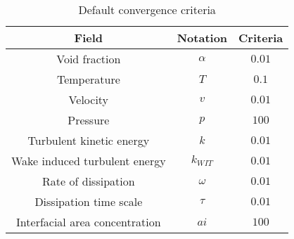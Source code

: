 \begin{table}[!h]
    \centering
       \begin{tabular}{c c c}
        \toprule
        Field & Notation & Criteria   \\
        \midrule
        \rowcolor[gray]{0.9} Void fraction & $\alpha$  & $0.01$  \\
        Temperature & $T$  & $0.1$ \\
        \rowcolor[gray]{0.9} Velocity & $v$ &  $0.01$ \\
        Pressure & $p$  &  $100$\\
        \rowcolor[gray]{0.9} Turbulent kinetic energy & $k$   &  $0.01$\\
        Wake induced turbulent energy & $k_{WIT}$ &   $0.01$\\
        \rowcolor[gray]{0.9} Rate of dissipation & $\omega$  &  $0.01$\\
        Dissipation time scale & $\tau$  &  $0.01$ \\
        \rowcolor[gray]{0.9} Interfacial area concentration & $ai$ &  $100$ \\
        \bottomrule
    \end{tabular}
    \caption{Default convergence criteria}
    \label{tab:convergence}
\end{table} 

